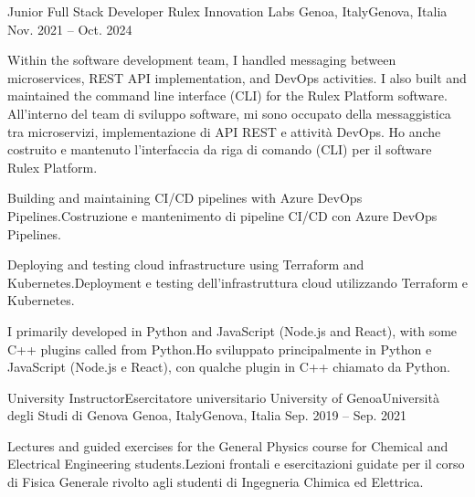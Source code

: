 \begin{cventries}
\cventry
{Junior Full Stack Developer} %
{Rulex Innovation Labs} %
{\ifenglish Genoa, Italy\else Genova, Italia\fi} %
{Nov. 2021 -- Oct. 2024} %
{ %
\begin{cvitems}
\item {\ifenglish 
    Within the software development team, I handled messaging between microservices, REST API implementation, and DevOps activities.
    I also built and maintained the command line interface (CLI) for the Rulex Platform software.
\else
    All'interno del team di sviluppo software, mi sono occupato della messaggistica tra microservizi, implementazione di API REST e attività DevOps.
    Ho anche costruito e mantenuto l'interfaccia da riga di comando (CLI) per il software Rulex Platform.
\fi}
\item {\ifenglish Building and maintaining CI/CD pipelines with Azure DevOps Pipelines.\else Costruzione e mantenimento di pipeline CI/CD con Azure DevOps Pipelines.\fi}
\item {\ifenglish Deploying and testing cloud infrastructure using Terraform and Kubernetes.\else Deployment e testing dell'infrastruttura cloud utilizzando Terraform e Kubernetes.\fi}
\item {\ifenglish I primarily developed in Python and JavaScript (Node.js and React), with some C++ plugins called from Python.\else Ho sviluppato principalmente in Python e JavaScript (Node.js e React), con qualche plugin in C++ chiamato da Python.\fi}
\end{cvitems}
}


\cventry
{\ifenglish University Instructor\else Esercitatore universitario\fi} %
{\ifenglish University of Genoa\else Università degli Studi di Genova\fi} %
{\ifenglish Genoa, Italy\else Genova, Italia\fi} %
{Sep. 2019 -- Sep. 2021} %
{ %
\begin{cvitems}
\item {\ifenglish Lectures and guided exercises for the General Physics course for Chemical and Electrical Engineering students.\else Lezioni frontali e esercitazioni guidate per il corso di Fisica Generale rivolto agli studenti di Ingegneria Chimica ed Elettrica.\fi}
\end{cvitems}
}



\end{cventries}
